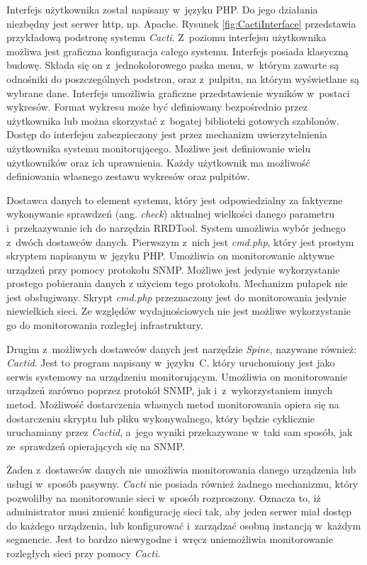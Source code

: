 Interfejs użytkownika został napisany w~języku PHP. Do jego działania
niezbędny jest serwer http, np. Apache. Rysunek
\ref{fig:CactiInterface} przedstawia przykładową podstronę systemu
{\em Cacti}. Z~poziomu interfejsu użytkownika możliwa jest graficzna
konfiguracja całego systemu. Interfejs posiada klasyczną
budowę. Składa się on z~jednokolorowego paska menu, w~którym zawarte
są odnośniki do poszczególnych podstron, oraz z~pulpitu, na którym
wyświetlane są wybrane dane. Interfejs umożliwia graficzne
przedstawienie wyników w~postaci wykresów. Format wykresu może być
definiowany bezpośrednio przez użytkownika lub można skorzystać
z~bogatej biblioteki gotowych szablonów. Dostęp do interfejsu
zabezpieczony jest przez mechanizm uwierzytelnienia użytkownika
systemu monitorującego. Możliwe jest definiowanie wielu użytkowników
oraz ich uprawnienia. Każdy użytkownik ma możliwość definiowania
własnego zestawu wykresów oraz pulpitów.

Dostawca danych to element systemu, który jest odpowiedzialny za
faktyczne wykonywanie sprawdzeń (ang. {\em check}) aktualnej wielkości
danego parametru i~przekazywanie ich do narzędzia RRDTool. System
umożliwia wybór jednego z~dwóch dostawców danych. Pierwszym z~nich
jest {\em cmd.php}, który jest prostym skryptem napisanym w~języku
PHP. Umożliwia on monitorowanie aktywne urządzeń przy pomocy protokołu
SNMP.  Możliwe jest jedynie wykorzystanie prostego pobierania danych z
użyciem tego protokołu. Mechanizm pułapek nie jest obsługiwany. Skrypt
{\em cmd.php} przeznaczony jest do monitorowania jedynie niewielkich
sieci. Ze względów wydajnościowych nie jest możliwe wykorzystanie go
do monitorowania rozległej infrastruktury.

Drugim z~możliwych dostawców danych jest narzędzie {\em Spine},
nazywane również: {\em Cactid}. Jest to program napisany w~języku~C,
który uruchomiony jest jako serwis systemowy na urządzeniu
monitorującym. Umożliwia on monitorowanie urządzeń zarówno poprzez
protokół SNMP, jak i~z~wykorzystaniem innych metod. Możliwość
dostarczenia własnych metod monitorowania opiera się na dostarczeniu
skryptu lub pliku wykonywalnego, który będzie cyklicznie uruchamiany
przez {\em Cactid}, a~jego wyniki przekazywane w~taki sam sposób, jak
ze~sprawdzeń opierających się na SNMP.

Żaden z~dostawców danych nie umożliwia monitorowania danego urządzenia
lub usługi w~sposób pasywny. {\em Cacti} nie posiada również żadnego
mechanizmu, który pozwoliłby na monitorowanie sieci w~sposób
rozproszony. Oznacza to, iż administrator musi zmienić konfigurację
sieci tak, aby jeden serwer miał dostęp do każdego urządzenia, lub
konfigurować i~zarządzać osobną instancją w~każdym segmencie. Jest to
bardzo niewygodne i~wręcz uniemożliwia monitorowanie rozległych sieci
przy pomocy {\em Cacti}.

